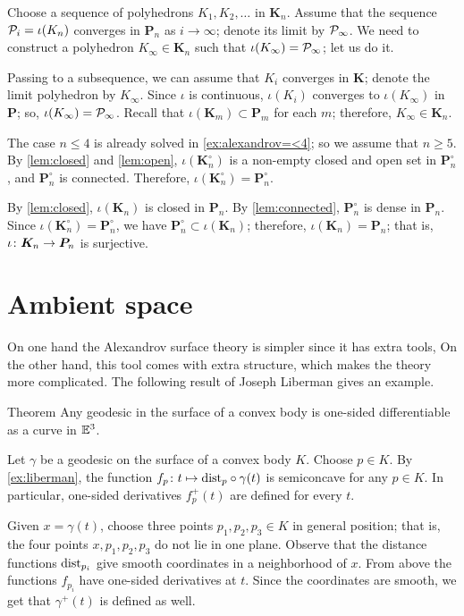 Choose a sequence of polyhedrons $K_1,K_2,\ldots$ in $\bm{K}_n$.
Assume that the sequence $\mathcal{P}_i=\iota(K_n)$ converges in $\bm{P}_n$ as $i\to \infty$;
denote its limit by $\mathcal{P}_\infty$.
We need to construct a polyhedron $K_\infty\in \bm{K}_n$ such that $\iota(K_\infty)=\mathcal{P}_\infty$;
let us do it.

Passing to a subsequence, we can assume that $K_i$ converges in $\bm{K}$;
denote the limit polyhedron by $K_\infty$.
Since $\iota$ is continuous, $\iota(K_i)$ converges to $\iota(K_\infty)$ in~$\bm{P}$; so, $\iota(K_\infty)=\mathcal{P}_\infty$.
Recall that $\iota(\bm{K}_m)\subset\bm{P}_m$ for each $m$; therefore, $K_\infty\in \bm{K}_n$.


The case $n\le 4$ is already solved in \ref{ex:alexandrov=<4}; so we assume that $n\ge 5$.
By \ref{lem:closed} and \ref{lem:open},
$\iota(\bm{K}_n^\circ)$ is a non-empty closed and open set in $\bm{P}_n^\circ$, and $\bm{P}_n^\circ$ is connected.
Therefore, $\iota(\bm{K}_n^\circ)=\bm{P}_n^\circ$.

By \ref{lem:closed}, $\iota(\bm{K}_n)$ is closed in $\bm{P}_n$.
By \ref{lem:connected}, $\bm{P}_n^\circ$ is dense in $\bm{P}_n$.
Since $\iota(\bm{K}_n^\circ)=\bm{P}_n^\circ$, we have $\bm{P}_n^\circ\subset \iota(\bm{K}_n)$;
therefore, $\iota(\bm{K}_n)=\bm{P}_n$;
that is, $\iota\colon\bm{K}_n\to\bm{P}_n$ is surjective.
\qeds

\section{Ambient space}

On one hand the Alexandrov surface theory is simpler since it has extra tools,
On the other hand, this tool comes with extra structure, which makes the theory more complicated.
The following result of Joseph Liberman \cite{liberman} gives an example.

\begin{thm}{Theorem}
Any geodesic in the surface of a convex body is one-sided differentiable as a curve in $\mathbb{E}^3$.
\end{thm}

Let $\gamma$ be a geodesic on the surface of a convex body $K$.
Choose $p\in K$.
By \ref{ex:liberman}, the function $f_p\colon t\mapsto \mathrm{dist}_p\circ\gamma(t)$ is semiconcave for any $p\in K$.
In particular, one-sided derivatives $f_p^+(t)$ are defined for every $t$.

Given $x=\gamma(t)$, choose three points $p_1,p_2,p_3\in K$ in general position;
that is, the four points $x,p_1,p_2,p_3$ do not lie in one plane.
Observe that the distance functions $\mathrm{dist}_{p_i}$ give smooth coordinates in a neighborhood of $x$.
From above the functions $f_{p_i}$ have one-sided derivatives at $t$.
Since the coordinates are smooth, we get that $\gamma^+(t)$ is defined as well.
\qeds




